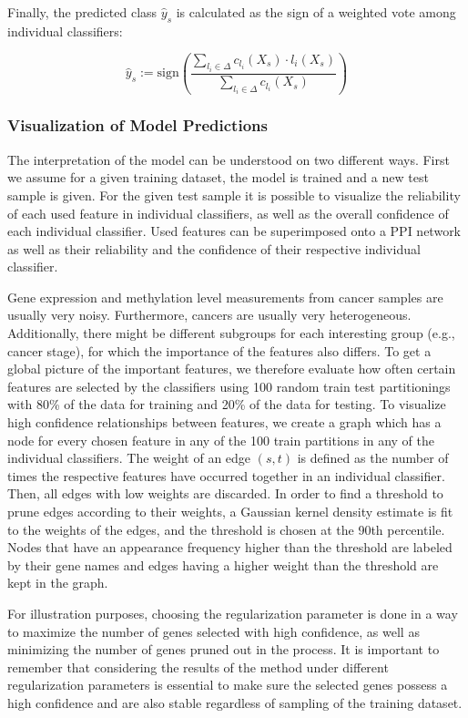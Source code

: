 \noindent Finally, the predicted class $\hat{y}_s$ is calculated as the sign of a weighted vote among individual classifiers:

\begin{equation}
\hat{y}_s := \textrm{sign}\left(\frac{\sum_{l_i \in \Delta} c_{l_i}(X_s) \cdot l_i(X_s)}{\sum_{l_i \in \Delta} c_{l_i}(X_s)}\right)
\end{equation}

\subsubsection{Visualization of Model Predictions}
\label{sec:visualization-of-model-predictions}
The interpretation of the model can be understood on two different ways. First we assume for a given training dataset, the model is trained and a new test sample is given.
For the given test sample it is possible to visualize the reliability of each used feature in individual classifiers, as well as the overall confidence of each individual classifier. 
Used features can be superimposed onto a PPI network as well as their reliability and the confidence of their respective individual classifier.

\noindent Gene expression and methylation level measurements from cancer samples are usually very noisy. Furthermore, cancers are usually very heterogeneous. Additionally, there might be different subgroups for each interesting group (e.g., cancer stage), for which the importance of the features also differs. To get a global picture of the important features, we therefore evaluate how often certain features are selected by the classifiers using 100 random train test partitionings with 80\% of the data for training and 20\% of the data for testing. 
 To visualize high confidence relationships between features, we create a graph which has a node for every chosen feature in any of the 100 train partitions in any of the individual classifiers. The weight of an edge $(s, t)$ is defined as the number of times the respective features have occurred together in an individual classifier. Then, all edges with low weights are discarded. In order to find a threshold to prune edges according to their weights, a Gaussian kernel density estimate is fit to the weights of the edges, and the threshold is chosen at the 90th percentile. Nodes that have an appearance frequency higher than the threshold are labeled by their gene names and edges having a higher weight than the threshold are kept in the graph.

For illustration purposes, choosing the regularization parameter is done in a way to maximize the number of genes selected with high confidence, as well as minimizing the number of genes pruned out in the process. It is important to remember that considering the results of the method under different regularization parameters is essential to make sure the selected genes possess a high confidence and are also stable regardless of sampling of the training dataset.
